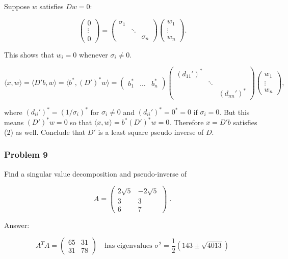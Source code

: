 \documentclass{article}
\begin{document}
Suppose $w$ satisfies $Dw = 0$:

$$
\begin{pmatrix}
0 \\ \vdots \\ 0
\end{pmatrix}
= 
\begin{pmatrix}
\sigma_1 & & \\ & \ddots & \\ & & \sigma_n
\end{pmatrix}
\begin{pmatrix}
w_1 \\ \vdots \\ w_n
\end{pmatrix}.
$$

This shows that $w_i = 0$ whenever $\sigma_i \neq 0$. 

$$
\langle x , w \rangle = \langle D'b , w \rangle = \langle b^*, (D')^*w \rangle = \begin{pmatrix}
b_1^* & \dots & b_n^* 
\end{pmatrix}
\begin{pmatrix}
(d_{11}')^* & & \\ & \ddots & \\ & & (d_{nn}')^*
\end{pmatrix}
\begin{pmatrix}
w_1 \\ \vdots \\ w_n
\end{pmatrix},
$$

where $(d_{ii}')^* = \left(1/\sigma_i\right)^*$ for $\sigma_i \neq 0$ and $(d_{ii}')^* = 0^* = 0$ if $\sigma_i = 0$. But this means $(D')^*w = 0$ so that $\langle x, w \rangle = b^*(D')^*w = 0$. Therefore $x = D'b$ satisfies (2) as well. Conclude that $D'$ is a least square pseudo inverse of $D$. 

\subsubsection*{Problem 9}

Find a singular value decomposition and pseudo-inverse of 

$$
A = \begin{pmatrix}
2\sqrt{5} & -2\sqrt{5} \\
3 & 3 \\
6 & 7
\end{pmatrix} \;.
$$

Answer:

$$
A^TA = \begin{pmatrix}
65 & 31 \\ 31 & 78
\end{pmatrix} \quad \text{has eigenvalues } \sigma^2 = \frac{1}{2}(143 \pm \sqrt{4013})
$$
\end{document}

